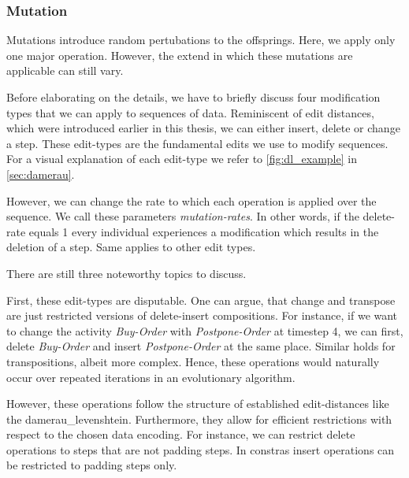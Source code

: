\documentclass[./../../paper.tex]{subfiles}
\begin{document}

\subsubsection{Mutation}
Mutations introduce random pertubations to the offsprings. Here, we apply only one major operation. However, the extend in which these mutations are applicable can still vary.

Before elaborating on the details, we have to briefly discuss four modification types that we can apply to sequences of data. Reminiscent of edit distances, which were introduced earlier in this thesis, we can either insert, delete or change a step. These edit-types are the fundamental edits we use to modify sequences. For a visual explanation of each edit-type we refer to \autoref{fig:dl_example} in \autoref{sec:damerau}.

However, we can change the rate to which each operation is applied over the sequence. We call these parameters \emph{mutation-rates}. In other words, if the delete-rate equals 1 every individual experiences a modification which results in the deletion of a step. Same applies to other edit types. 

\noindent There are still three noteworthy topics to discuss.

First, these edit-types are disputable. One can argue, that change and transpose are just restricted versions of delete-insert compositions. For instance, if we want to change the activity \emph{Buy-Order} with \emph{Postpone-Order} at timestep 4, we can first, delete \emph{Buy-Order} and insert \emph{Postpone-Order} at the same place. Similar holds for transpositions, albeit more complex. Hence, these operations would naturally occur over repeated iterations in an evolutionary algorithm.

However, these operations follow the structure of established edit-distances like the \gls{damerau_levenshtein}. Furthermore, they allow for efficient restrictions with respect to the chosen data encoding. For instance, we can restrict delete operations to steps that are not padding steps. In constras insert operations can be restricted to padding steps only.
\end{document}
